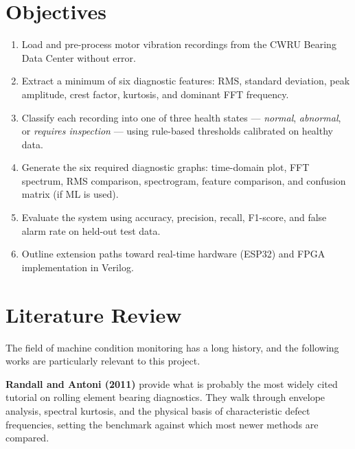 \documentclass[12pt,a4paper]{article}
\begin{document}
\section{Objectives}

\begin{enumerate}[label=\textbf{O\arabic*.}]
  \item Load and pre-process motor vibration recordings from the
        CWRU Bearing Data Center without error.
  \item Extract a minimum of six diagnostic features: RMS, standard
        deviation, peak amplitude, crest factor, kurtosis, and
        dominant FFT frequency.
  \item Classify each recording into one of three health states ---
        \emph{normal}, \emph{abnormal}, or \emph{requires inspection}
        --- using rule-based thresholds calibrated on healthy data.
  \item Generate the six required diagnostic graphs: time-domain
        plot, FFT spectrum, RMS comparison, spectrogram, feature
        comparison, and confusion matrix (if ML is used).
  \item Evaluate the system using accuracy, precision, recall,
        F1-score, and false alarm rate on held-out test data.
  \item Outline extension paths toward real-time hardware (ESP32)
        and FPGA implementation in Verilog.
\end{enumerate}

\section{Literature Review}

The field of machine condition monitoring has a long history, and
the following works are particularly relevant to this project.

\textbf{Randall and Antoni (2011)} \cite{randall2011} provide what
is probably the most widely cited tutorial on rolling element
bearing diagnostics. They walk through envelope analysis, spectral
kurtosis, and the physical basis of characteristic defect
frequencies, setting the benchmark against which most newer methods
are compared.
\end{document}

